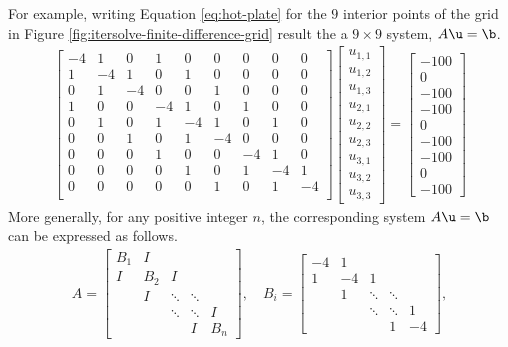 For example, writing Equation \ref{eq:hot-plate} for the $9$ interior points of the grid in Figure \ref{fig:itersolve-finite-difference-grid} result the a $9 \times 9$ system, $A\u = \b$.
\begin{align*}
\left[\begin{array}{ccccccccc}
-4 & 1  &  0 &  1 &  0 &  0 &  0 &  0 & 0 \\
 1 & -4 &  1 &  0 &  1 &  0 &  0 &  0 & 0 \\
 0 & 1  & -4 &  0 &  0 &  1 &  0 &  0 & 0 \\
 1 & 0  &  0 & -4 &  1 &  0 &  1 &  0 & 0 \\
 0 & 1  &  0 &  1 & -4 &  1 &  0 &  1 & 0 \\
 0 & 0  &  1 &  0 &  1 & -4 &  0 &  0 & 0 \\
 0 & 0  &  0 &  1 &  0 &  0 & -4 &  1 & 0 \\
 0 & 0  &  0 &  0 &  1 &  0 &  1 & -4 & 1 \\
 0 & 0  &  0 &  0 &  0 &  1 &  0 &  1 & -4 \\
\end{array}\right]
\left[\begin{array}{c}
u_{1,1} \\ u_{1,2} \\ u_{1,3} \\
u_{2,1} \\ u_{2,2} \\ u_{2,3} \\
u_{3,1} \\ u_{3,2} \\ u_{3,3}
\end{array}\right]
=
\left[\begin{array}{c}
-100 \\ 0 \\ -100 \\
-100 \\ 0 \\ -100 \\
-100 \\ 0 \\ -100
\end{array}\right]
\end{align*}
More generally, for any positive integer $n$, the corresponding system $A \u = \b$ can be expressed as follows.
\begin{align*}
A = \left[\begin{array}{ccccc}
B_1 & I &      &        & \\
I & B_2 &  I   &        & \\
  & I & \ddots & \ddots & \\
  &   & \ddots & \ddots & I \\
  &   &        &    I   & B_n
\end{array}\right],
\quad
B_i = \begin{bmatrix}
-4 &  1 &      &        & \\
 1 & -4 &  1   &        & \\
   &  1 & \ddots & \ddots & \\
   &    & \ddots & \ddots & 1 \\
   &    &        &    1   & -4
\end{bmatrix},
\end{align*}
